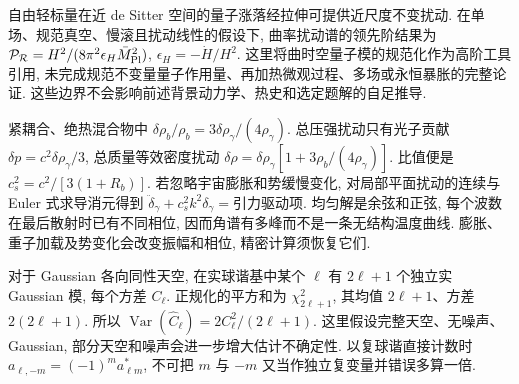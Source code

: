 自由轻标量在近 de Sitter 空间的量子涨落经拉伸可提供近尺度不变扰动. 在单场、规范真空、慢滚且扰动线性的假设下, 曲率扰动谱的领先阶结果为 $\mathcal P_{\mathcal R}=H^2/(8\pi^2\epsilon_H\bar M_{\rm Pl}^2)$, $\epsilon_H=-\dot H/H^2$. 这里将曲时空量子模的规范化作为高阶工具引用, 未完成规范不变量量子作用量、再加热微观过程、多场或永恒暴胀的完整论证. 这些边界不会影响前述背景动力学、热史和选定题解的自足推导.

紧耦合、绝热混合物中 $\delta\rho_b/\rho_b=3\delta\rho_\gamma/(4\rho_\gamma)$. 总压强扰动只有光子贡献 $\delta p=c^2\delta\rho_\gamma/3$, 总质量等效密度扰动 $\delta\rho=\delta\rho_\gamma[1+3\rho_b/(4\rho_\gamma)]$. 比值便是 $c_s^2=c^2/[3(1+R_b)]$. 若忽略宇宙膨胀和势缓慢变化, 对局部平面扰动的连续与 Euler 式求导消元得到 $\ddot\delta_\gamma+c_s^2k^2\delta_\gamma=\text{引力驱动项}$. 均匀解是余弦和正弦, 每个波数在最后散射时已有不同相位, 因而角谱有多峰而不是一条无结构温度曲线. 膨胀、重子加载及势变化会改变振幅和相位, 精密计算须恢复它们.

对于 Gaussian 各向同性天空, 在实球谐基中某个 $\ell$ 有 $2\ell+1$ 个独立实 Gaussian 模, 每个方差 $C_\ell$. 正规化的平方和为 $\chi^2_{2\ell+1}$, 其均值 $2\ell+1$、方差 $2(2\ell+1)$. 所以 $\operatorname{Var}(\widehat C_\ell)=2C_\ell^2/(2\ell+1)$. 这里假设完整天空、无噪声、Gaussian, 部分天空和噪声会进一步增大估计不确定性. 以复球谐直接计数时 $a_{\ell,-m}=(-1)^ma_{\ell m}^*$, 不可把 $m$ 与 $-m$ 又当作独立复变量并错误多算一倍.
